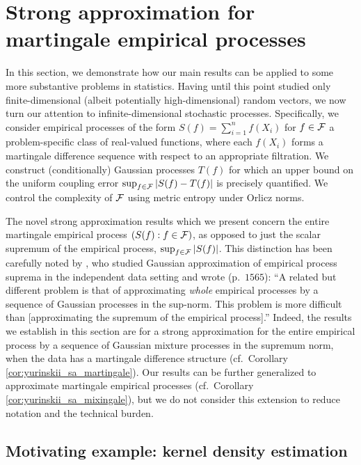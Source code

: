 \section{Strong approximation for martingale empirical processes}%
\label{sec:yurinskii_emp_proc}

In this section, we demonstrate how our main results can be applied to some more
substantive problems in statistics. Having until this point studied only
finite-dimensional (albeit potentially high-dimensional) random vectors, we now
turn our attention to infinite-dimensional stochastic processes. Specifically,
we consider empirical processes of the form
$S(f) = \sum_{i=1}^{n} f(X_i)$ for $f \in \mathcal{F}$
a problem-specific class of real-valued
functions, where each $f(X_i)$ forms a martingale difference sequence with
respect to an appropriate filtration. We construct (conditionally) Gaussian
processes $T(f)$ for which an upper bound on the uniform coupling error
$\sup_{f \in \mathcal{F}} |S(f) - T(f)|$ is precisely quantified. We control the
complexity of $\mathcal{F}$ using metric entropy under Orlicz norms.

The novel strong approximation results which we present concern the entire
martingale empirical process $(S(f):f \in \mathcal{F})$, as opposed to just the scalar
supremum of the empirical process, $\sup_{f \in \mathcal{F}} |S(f)|$. This distinction
has been carefully noted by \citet{chernozhukov2014gaussian}, who studied
Gaussian approximation of empirical process suprema in the independent data
setting and wrote (p.\ $1565$): ``A related but different problem is that of
approximating \textit{whole} empirical processes by a sequence of Gaussian
processes in the sup-norm. This problem is more difficult than
[approximating the supremum of the empirical process].''
Indeed, the results we establish in
this section are for a strong approximation for the entire empirical process by
a sequence of Gaussian mixture processes in the supremum norm, when the data
has a martingale difference structure
(cf.\ Corollary \ref{cor:yurinskii_sa_martingale}).
Our results can be further generalized to approximate martingale
empirical processes (cf.\ Corollary \ref{cor:yurinskii_sa_mixingale}), but we
do not
consider this extension to reduce notation and the technical burden.

\subsection{Motivating example: kernel density estimation}
\label{sec:yurinskii_kde}

